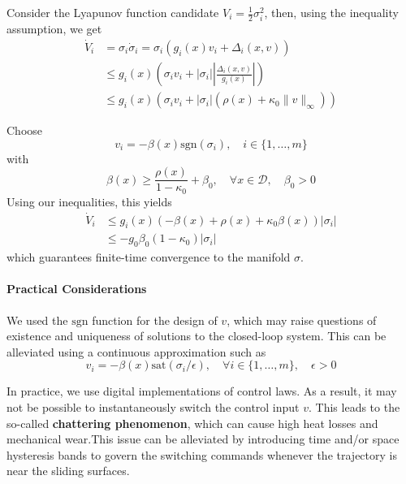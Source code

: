 \newpar{}

Consider the Lyapunov function candidate $V_i = \frac{1}{2}\sigma_i^2$, then, using the inequality assumption, we get
\begin{align*}
    \dot{V}_i & = \sigma_i\dot{\sigma}_i = \sigma_i\left(g_i(x)v_i + \Delta_i(x, v)\right)                        \\
              & \leq g_i(x)\left( \sigma_i v_i + |\sigma_i| \left| \frac{\Delta_i(x, v)}{g_i(x)} \right| \right)  \\
              & \leq g_i(x)\left( \sigma_i v_i + |\sigma_i|\left( \rho(x) + \kappa_0 \|v\|_\infty \right) \right)
\end{align*}

\newpar{}

Choose
\begin{equation*}
    v_i = -\beta(x)\text{sgn}(\sigma_i), \quad i \in \{1, \dots, m\}
\end{equation*}
with
\begin{equation*}
    \beta(x) \geq \frac{\rho(x)}{1 - \kappa_0} + \beta_0, \quad \forall x \in\mathcal{D}, \quad \beta_0 > 0
\end{equation*}
Using our inequalities, this yields
\begin{align*}
    \dot{V}_i & \leq g_i(x)( -\beta(x) + \rho(x) + \kappa_0\beta(x) )|\sigma_i| \\
              & \leq -g_0\beta_0(1 - \kappa_0)|\sigma_i|
\end{align*}
which guarantees finite-time convergence to the manifold $\sigma$.

\paragraph{Practical Considerations}

We used the $\text{sgn}$ function for the design of $v$, which may raise questions of existence and uniqueness of solutions to the closed-loop system. This can be alleviated using a continuous approximation such as
\begin{equation*}
    v_i = -\beta(x)\text{sat}(\sigma_i / \epsilon), \quad \forall i \in \{1, \dots, m\}, \quad \epsilon > 0
\end{equation*}

\newpar{}

In practice, we use digital implementations of control laws. As a result, it may not be possible to instantaneously switch the control input $v$. This leads to the so-called \textbf{chattering phenomenon}, which can cause high heat losses and mechanical wear.This issue can be alleviated by introducing time and/or space hysteresis bands to govern the switching commands whenever the trajectory is near the sliding surfaces.

